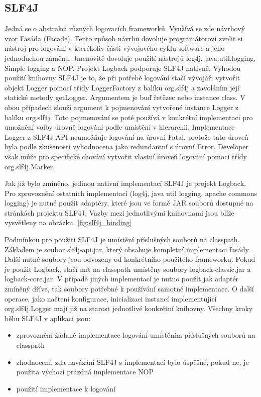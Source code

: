 \documentclass[ing,male,java,dept460]{diploma}		%
\begin{document}
\subsection{SLF4J}
Jedná se o abstrakci různých logovacích frameworků. Využívá se zde návrhový vzor Fasáda (Facade). Tento způsob návrhu dovoluje programátorovi zvolit si nástroj pro logování v kterékoliv části vývojového cyklu software a jeho jednoduchou záměnu. Jmenovitě dovoluje použití nástrojů log4j, java.util.logging, Simple logging a NOP. Projekt Logback podporuje SLF4J nativně. Výhodou použití knihovny SLF4J je to, že při potřebě logování stačí vývojáři vytvořit objekt Logger pomocí třídy LoggerFactory z balíku org.slf4j a zavoláním její statické metody getLogger. Argumentem je buď řetězec nebo instance class. V obou případech slouží argument k pojmenování vytvořené instance Logger z balíku org.slf4j. Toto pojmenování se poté používá v konkrétní implementaci pro umožnění volby úrovně logování podle umístění v hierarchii. Implementace Logger z SLF4J API neumožňuje logování na úrovni Fatal, protože tato úroveň byla podle zkušeností vyhodnocena jako redundantní s úrovní Error. Developer však může pro specifické chování vytvořit vlastní úroveň logování pomocí třídy org.slf4j.Marker.
\par Jak již bylo zmíněno, jedinou nativní implementací SLF4J je projekt Logback. Pro zprovoznění ostatních implementací (log4j, java util logging, apache commons logging) je nutné použít adaptéry, které jsou ve formě JAR souborů dostupné na stránkách projektu SLF4J. Vazby mezi jednotlivými knihovnami jsou blíže vysvětleny na obrázku. \ref{fig:slf4j_binding}
\par Podmínkou pro použití SLF4J je umístění příslušných souborů na classpath. Základem je soubor slf4j-api.jar, který obsahuje kompletní implementaci fasády. Další nutné soubory jsou odvozeny od konkrétního použitého frameworku. Pokud je použit Logback, stačí mít na classpath umístěny soubory logback-classic.jar a logback-core.jar. V případě jiných implementací je nutno použít jak adaptér zmíněný dříve, tak soubory potřebné k používání samotné implementace. O další operace, jako načtení konfigurace, inicializaci instancí implementující org.slf4j.Logger mají již na starost jednotlivé konkrétní knihovny. Všechny kroky běhu SLF4J v aplikaci jsou:
\begin{itemize}
  \item zprovoznění žádané implementace logování umístěním příslušných souborů na classpath
  \item zhodnocení, zda navázání SLF4J s implementací bylo úspěšné, pokud ne, je použita výchozí prázdná implementace NOP
  \item použití implementace k logování
\end{itemize}
\end{document}
